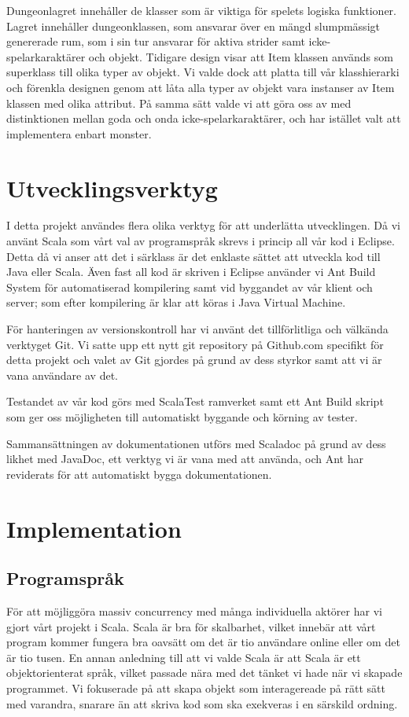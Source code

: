 \documentclass[a4paper]{article}
\begin{document}
Dungeonlagret innehåller de klasser som är viktiga för spelets logiska funktioner. Lagret innehåller dungeonklassen, som ansvarar över en mängd slumpmässigt genererade rum, som i sin tur
ansvarar för aktiva strider samt icke-spelarkaraktärer och objekt. Tidigare design visar att Item klassen används som superklass till olika typer av objekt. Vi valde dock att platta till 
vår klasshierarki och förenkla designen genom att låta alla typer av objekt vara instanser av Item klassen med olika attribut. På samma sätt valde vi att göra oss av med distinktionen mellan
goda och onda icke-spelarkaraktärer, och har istället valt att implementera enbart monster.

\section{Utvecklingsverktyg}

I detta projekt användes flera olika verktyg för att underlätta utvecklingen. Då vi använt Scala som vårt val av programspråk skrevs i princip all vår kod i Eclipse. 
Detta då vi anser att det i särklass är det enklaste sättet att utveckla kod till Java eller Scala. Även fast all kod är skriven i Eclipse använder vi Ant Build System 
för automatiserad kompilering samt vid byggandet av vår klient och server; som efter kompilering är klar att köras i Java Virtual Machine. 

För hanteringen av versionskontroll har vi använt det tillförlitliga och välkända verktyget Git. Vi satte upp ett nytt git repository på Github.com specifikt för detta 
projekt och valet av Git gjordes på grund av dess styrkor samt att vi är vana användare av det.

Testandet av vår kod görs med ScalaTest ramverket samt ett Ant Build skript som ger oss möjligheten till automatiskt byggande och körning av tester.

Sammansättningen av dokumentationen utförs med Scaladoc på grund av dess likhet med JavaDoc, ett verktyg vi är vana med att använda, och Ant har reviderats för att automatiskt 
bygga dokumentationen.

\section{Implementation}

\subsection{Programspråk}
För att möjliggöra massiv concurrency med många individuella aktörer har vi gjort vårt projekt i Scala. Scala är bra för skalbarhet, vilket innebär att vårt program kommer fungera bra oavsätt om det är tio användare online eller om det är tio tusen. En annan anledning till att vi valde Scala är att Scala är ett objektorienterat språk, vilket passade nära med det tänket vi hade när vi skapade programmet. Vi fokuserade på att skapa objekt som interagereade på rätt sätt med varandra, snarare än att skriva kod som ska exekveras i en särskild ordning.
\end{document}
